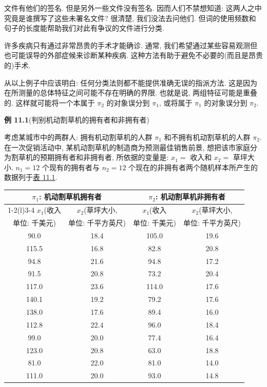 
文件有他们的签名. 但是另外一些文件没有签名. 因而人们不禁想知道: 这两人之中究竟是谁撰写了这些未署名文件? 很清楚, 我们没法去问他们. 但词的使用频数和句子的长度能帮助我们对此有争议的文件进行分类.

许多疾病只有通过非常昂贵的手术才能确诊. 通常, 我们希望通过某些容易观测但也可能误导的外部症候来诊断某种疾病. 这种方法有助于避免不必要的(而且是昂贵的)手术.

从以上例子中应该明白: 任何分类法则都不能提供准确无误的指派方法. 这是因为在所测量的总体特征之间可能不存在明确的界限. 也就是说, 两组特征可能是重叠的. 这样就可能将一个本属于 $\pi_2$ 的对象误分到 $\pi_1$, 或将属于 $\pi_1$ 的对象误分到 $\pi_2$.

\noindent\textbf{例 11.1}\quad (判别机动割草机的拥有者和非拥有者)

考虑某城市中的两群人: 拥有机动割草机的人群 $\pi_1$ 和不拥有机动割草机的人群 $\pi_2$. 在一次促销活动中, 某机动割草机的制造商为预测最佳销售前景, 想把该市家庭分为割草机的预期拥有者和非拥有者, 所依据的变量是: $x_1=$ 收入和 $x_2=$ 草坪大小. $n_1=12$ 个现有的拥有者与 $n_2=12$ 个现在的非拥有者两个随机样本所产生的数据列于\hyperref[tab:11.1]{表 11.1}.

\begin{mvtable}
\label{tab:11.1}
\begin{tabular}{@{}cccc@{}}
\toprule
\multicolumn{2}{c}{$\pi_1$: 机动割草机拥有者} & \multicolumn{2}{c}{$\pi_2$: 机动割草机非拥有者}\\
\cmidrule(r){1-2}\cmidrule(l){3-4}
$x_1$(收入 & $x_2$(草坪大小, & $x_1$(收入 & $x_2$(草坪大小,\\
单位: 千美元) & 单位: 千平方英尺) & 单位: 千美元) & 单位: 千平方英尺)\\
\midrule
90.0 & 18.4 & 105.0 & 19.6\\
115.5 & 16.8 & 82.8 & 20.8\\
94.8 & 21.6 & 94.8 & 17.2\\
91.5 & 20.8 & 73.2 & 20.4\\
117.0 & 23.6 & 114.0 & 17.6\\
140.1 & 19.2 & 79.2 & 17.6\\
138.0 & 17.6 & 89.4 & 16.0\\
112.8 & 22.4 & 96.0 & 18.4\\
99.0 & 20.0 & 77.4 & 16.4\\
123.0 & 20.8 & 63.0 & 18.8\\
81.0 & 22.0 & 81.0 & 14.0\\
111.0 & 20.0 & 93.0 & 14.8\\
\bottomrule
\end{tabular}
\end{mvtable}

